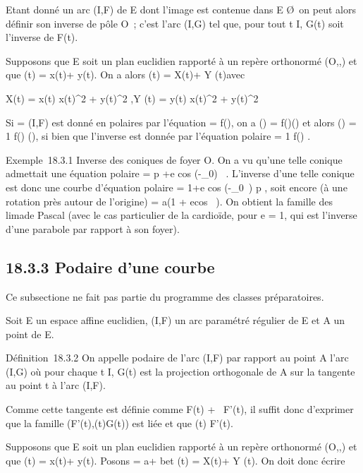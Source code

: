 \documentclass[]{article}
\begin{document}
Etant donné un arc (I,F) de E dont l'image est contenue dans E
\diagdown\O\, on peut alors définir son
inverse de pôle O~; c'est l'arc (I,G) tel que, pour tout t \in I, G(t)
soit l'inverse de F(t).

Supposons que E soit un plan euclidien rapporté à un repère orthonormé
(O,\vec\imath,) et que
\overrightarrowOF(t) = x(t)\vec\imath +
y(t). On a alors
\overrightarrowOG(t) = X(t)\vec\imath +
Y (t) avec

X(t) = x(t) \over x(t)^2 +
y(t)^2 ,\quad Y (t) = y(t)
\over x(t)^2 + y(t)^2

Si \Gamma = (I,F) est donné en polaires par l'équation \rho = f(\theta), on a
\overrightarrowOF(\theta) =
f(\theta)\vecu(\theta) et alors
\overrightarrowOG(\theta) = 1 \over
f(\theta) \vecu(\theta), si bien que l'inverse est donnée par
l'équation polaire \rho = 1 \over f(\theta) .

Exemple~18.3.1 Inverse des coniques de foyer O. On a vu qu'une telle
conique admettait une équation polaire \rho = p +e cos (\theta-\theta_0)~ . L'inverse d'une
telle conique est donc une courbe d'équation polaire \rho =
1+e cos (\theta-\theta_0~) \over
p , soit encore (à une rotation près autour de l'origine) \rho = a(1 +
ecos~ \theta). On obtient la famille des
lima\ccons de Pascal (avec le cas particulier de la
cardioïde, pour e = 1, qui est l'inverse d'une parabole par rapport à
son foyer).

\subsection{18.3.3 Podaire d'une courbe}

Ce subsectione ne fait pas partie du programme des classes préparatoires.

Soit E un espace affine euclidien, (I,F) un arc paramétré régulier de E
et A un point de E.

Définition~18.3.2 On appelle podaire de l'arc (I,F) par rapport au point
A l'arc (I,G) où pour chaque t \in I, G(t) est la projection orthogonale
de A sur la tangente au point t à l'arc (I,F).

Comme cette tangente est définie comme F(t) + ~F'(t), il suffit donc
d'exprimer que la famille
(F'(t),\overrightarrowF(t)G(t)) est liée et que
\overrightarrowAG(t) \bot F'(t).

Supposons que E soit un plan euclidien rapporté à un repère orthonormé
(O,\vec\imath,) et que
\overrightarrowOF(t) = x(t)\vec\imath +
y(t). Posons
\overrightarrowOA = a\vec\imath +
b et \overrightarrowOG(t) =
X(t)\vec\imath + Y (t). On doit
donc écrire
\end{document}
